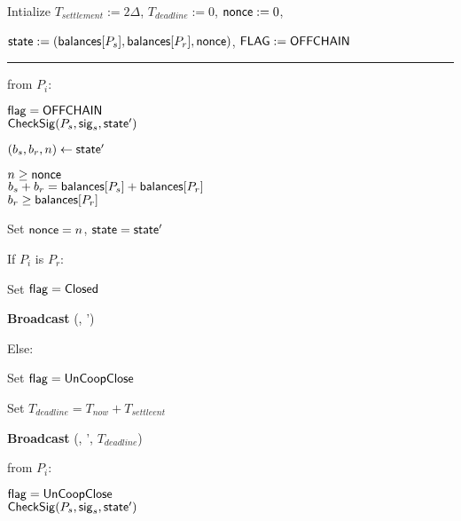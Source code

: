 \begin{bbox}[title={$\mathcal{C}_{pay}(P_s,P_r, \msf{balances}, \Delta)$}]

Intialize $T_{settlement} := 2 \Delta$, $T_{deadline} := 0$, ${\mathsf {nonce}} := 0$,


${\mathsf {state}} := ({\mathsf {balances}}[P_s], {\mathsf {balances}}[P_r], {\mathsf {nonce}})$, ${\mathsf {FLAG}} := {\mathsf {OFFCHAIN}}$

\vspace{2mm} \hrule \vspace{2mm}

\OnInput {} from $P_i$:
	\begin{renumerate}
		\item \Require ${\mathsf {flag}} = {\mathsf {OFFCHAIN}}$ \\
		\Require ${\mathsf {CheckSig}}(P_s,{\mathsf {sig}}_s, {\mathsf {state}}')$
		
		\item $(b_s, b_r, n) \leftarrow {\mathsf {state}}'$
		\item \Require $n \geq {\mathsf {nonce}}$ \\
		 \Require $b_s + b_r = {\mathsf {balances}}[P_s] + {\mathsf {balances}}[P_r]$ \\
		 \Require $b_r \geq {\mathsf {balances}}[P_r]$

		\item Set ${\mathsf {nonce}} = n$, ${\mathsf {state}} = {\mathsf {state}}'$

		\item If $P_i$ is $P_r$:
		\begin{renumerate}
			\item Set ${\mathsf {flag}} = {\mathsf {Closed}}$
			
			{\bf Broadcast} (, ')
		\end{renumerate}

		Else:
		\begin{renumerate}
			\item Set ${\mathsf {flag}} = {\mathsf {UnCoopClose}}$ 
			\item Set $T_{deadline} = T_{now} + T_{settleent}$
			
			{\bf Broadcast} (, ', $T_{deadline}$)
		\end{renumerate}
		
	\end{renumerate}

\OnInput {} from $P_i$:
	\begin{renumerate}
		\item \Require ${\mathsf {flag}} = {\mathsf {UnCoopClose}}$ \\
		\Require ${\mathsf {CheckSig}}(P_s, {\mathsf {sig}}_s, {\mathsf {state}}')$


\end{renumerate}
\end{bbox}
